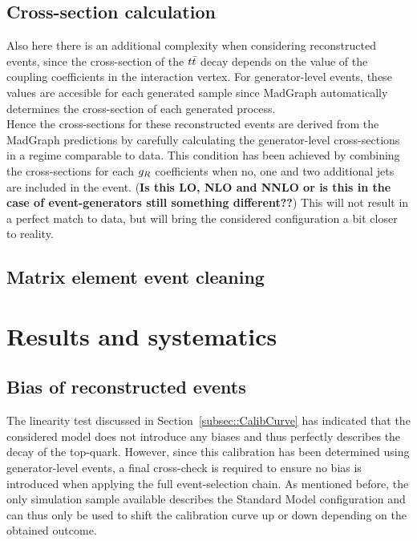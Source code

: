 \subsection{Cross-section calculation} \label{subsec::XSReco}

Also here there is an additional complexity when considering reconstructed events, since the cross-section of the $t\bar{t}$ decay depends on the value of the coupling coefficients in the interaction vertex. For generator-level events, these values are accesible for each generated sample since MadGraph automatically determines the cross-section of each generated process.
\\
Hence the cross-sections for these reconstructed events are derived from the MadGraph predictions by carefully calculating the generator-level cross-sections in a regime comparable to data. 
This condition has been achieved by combining the cross-sections for each $g_{R}$ coefficients when no, one and two additional jets are included in the event. (\textbf{Is this LO, NLO and NNLO or is this in the case of event-generators still something different??})
This will not result in a perfect match to data, but will bring the considered configuration a bit closer to reality.

\subsection{Matrix element event cleaning} \label{subsec::EvtCleaning}



\section{Results and systematics} \label{sec::Meas}

\subsection{Bias of reconstructed events}
The linearity test discussed in Section~\ref{subsec::CalibCurve} has indicated that the considered model does not introduce any biases and thus perfectly describes the decay of the top-quark. However, since this calibration has been determined using generator-level events, a final cross-check is required to ensure no bias is introduced when applying the full event-selection chain.
As mentioned before, the only simulation sample available describes the Standard Model configuration and can thus only be used to shift the calibration curve up or down depending on the obtained outcome.
\\
